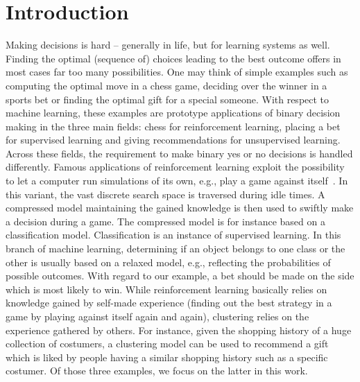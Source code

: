 \chapter{Introduction}
Making decisions is hard -- generally in life, but for learning systems as well. Finding the optimal (sequence of) choices leading to the best outcome offers in most cases far too many possibilities. One may think of simple examples such as computing the optimal move in a chess game, deciding over the winner in a sports bet or finding the optimal gift for a special someone. With respect to machine learning, these examples are prototype applications of binary decision making in the three main fields: chess for reinforcement learning, placing a bet for supervised learning and giving recommendations for unsupervised learning. Across these fields, the requirement to make binary yes or no decisions is handled differently. Famous applications of reinforcement learning exploit the possibility to let a computer run simulations of its own, e.g., play a game against itself~\citep{silver2017mastering}. In this variant, the vast discrete search space is traversed during idle times. A compressed model maintaining the gained knowledge is then used to swiftly make a decision during a game. The compressed model is for instance based on a classification model. Classification is an instance of supervised learning. In this branch of machine learning, determining if an object belongs to one class or the other is usually based on a relaxed model, e.g., reflecting the probabilities of possible outcomes. With regard to our example, a bet should be made on the side which is most likely to win.
While reinforcement learning basically relies on knowledge gained by self-made experience (finding out the best strategy in a game by playing against itself again and again), clustering relies on the experience gathered by others. For instance, given the shopping history of a huge collection of costumers, a clustering model can be used to recommend a gift which is liked by people having a similar shopping history such as a specific costumer. Of those three examples, we focus on the latter in this work.  

